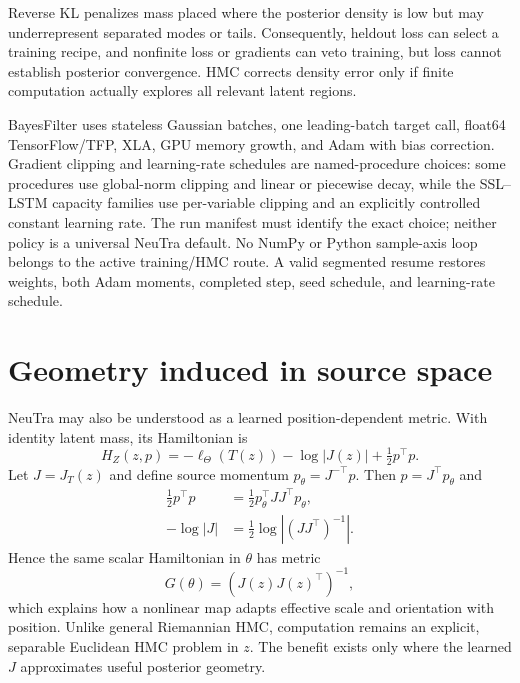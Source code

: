 Reverse KL penalizes mass placed where the posterior density is low but may
underrepresent separated modes or tails.  Consequently, heldout loss can
select a training recipe, and nonfinite loss or gradients can veto training,
but loss cannot establish posterior convergence.  HMC corrects density error
only if finite computation actually explores all relevant latent regions.

BayesFilter uses stateless Gaussian batches, one leading-batch target call,
float64 TensorFlow/TFP, XLA, GPU memory growth, and Adam with bias correction.
Gradient clipping and learning-rate schedules are named-procedure choices:
some procedures use global-norm clipping and linear or piecewise decay, while
the SSL--LSTM capacity families use per-variable clipping and an explicitly
controlled constant learning rate.  The run manifest must identify the exact
choice; neither policy is a universal NeuTra default.  No NumPy or Python
sample-axis loop belongs to the active training/HMC route.  A valid segmented
resume restores weights, both Adam moments, completed step, seed schedule, and
learning-rate schedule.



\section{Geometry induced in source space}

NeuTra may also be understood as a learned position-dependent metric.  With
identity latent mass, its Hamiltonian is
\begin{equation}
 H_Z(z,p)=-\ell_\Theta(T(z))-\log|J(z)|+\tfrac12p^\top p.
\end{equation}
Let $J=J_T(z)$ and define source momentum $p_\theta=J^{-\top}p$.  Then
$p=J^\top p_\theta$ and
\begin{align}
 \tfrac12p^\top p&=\tfrac12p_\theta^\top JJ^\top p_\theta,\\
 -\log|J|&=\tfrac12\log|(JJ^\top)^{-1}|.
\end{align}
Hence the same scalar Hamiltonian in $\theta$ has metric
\begin{equation}
 G(\theta)=(J(z)J(z)^\top)^{-1},
\end{equation}
which explains how a nonlinear map adapts effective scale and orientation with
position.  Unlike general Riemannian HMC, computation remains an explicit,
separable Euclidean HMC problem in $z$.  The benefit exists only where the
learned $J$ approximates useful posterior geometry.

